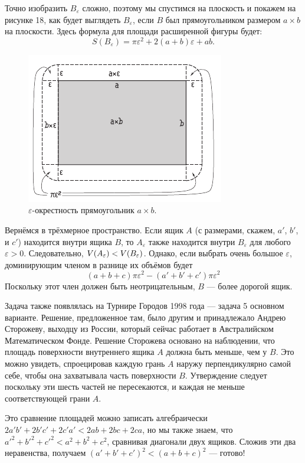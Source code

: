 Точно изобразить $B_\varepsilon$ сложно, поэтому мы спустимся на плоскость и покажем на рисунке 18, как будет выглядеть $B_\varepsilon$, если $B$ был прямоугольником размером $a \times b$ на плоскости.
Здесь формула для площади расширенной фигуры будет:
\[S(B_\varepsilon)=\pi\varepsilon^2+2(a+b)\varepsilon+ab.\]

\begin{figure}[ht!]
\centering
\includegraphics[scale=1]{pics/box}
\caption{$\varepsilon$-окрестность прямоугольник $a \times b$.}
\label{pic:box}
\end{figure}

Вернёмся в трёхмерное пространство.
Если ящик $A$ (с размерами, скажем, $a'$, $b'$, и $c'$) находится внутри ящика $B$, то $A_\varepsilon$ также находится внутри $B_\varepsilon$ для любого $\varepsilon > 0$.
Следовательно, $V(A_\varepsilon ) \z< V(B_\varepsilon)$.
Однако, если выбрать очень большое $\varepsilon$, доминирующим членом в разнице их объёмов будет
\[(a+b+c)\pi\varepsilon^2-(a'+b'+c')\pi\varepsilon^2\]
Поскольку этот член должен быть неотрицательным, $B$ --- более дорогой ящик.

Задача также появлялась на Турнире Городов 1998 года ---
задача 5 основном варианте.
Решение, предложенное там, было другим и принадлежало Андрею Сторожеву, выходцу из России, который сейчас работает в Австралийском Математическом Фонде.
Решение Сторожева основано на наблюдении, что площадь поверхности внутреннего ящика $A$ должна быть меньше, чем у  $B$.
Это можно увидеть, спроецировав каждую грань $A$ наружу перпендикулярно самой себе, чтобы она захватывала часть поверхности $B$.
Утверждение следует поскольку эти шесть частей не пересекаются, и каждая не меньше соответствующей грани $A$.

Это сравнение площадей можно записать алгебраически $2a'b'+2b'c'+2c'a' < 2ab+2bc+2ca$, но мы также знаем, что $a'^2+b'^2+c'^2<a^2+b^2+c^2$, сравнивая диагонали двух ящиков.
Сложив эти два неравенства, получаем 
$(a'+b'+c')^2<(a+b+c)^2$ --- готово!

